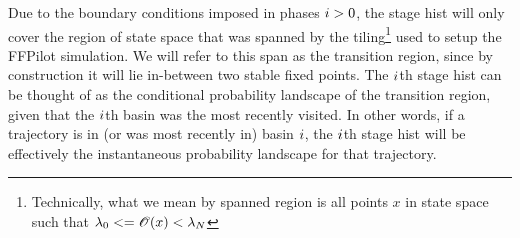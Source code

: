 Due to the boundary conditions imposed in phases $i>0$, the stage hist will only cover the region of state space that was spanned by the tiling\footnote{Technically, what we mean by spanned region is all points $x$ in state space such that $\lambda_0 <= \mathscr{O}(x) < \lambda_N$} used to setup the FFPilot simulation. We will refer to this span as the transition region, since by construction it will lie in-between two stable fixed points. The $i$th stage hist can be thought of as the conditional probability landscape of the transition region, given that the $i$th basin was the most recently visited. In other words, if a trajectory is in (or was most recently in) basin $i$, the $i$th stage hist will be effectively the instantaneous probability landscape for that trajectory.

%
%
    
